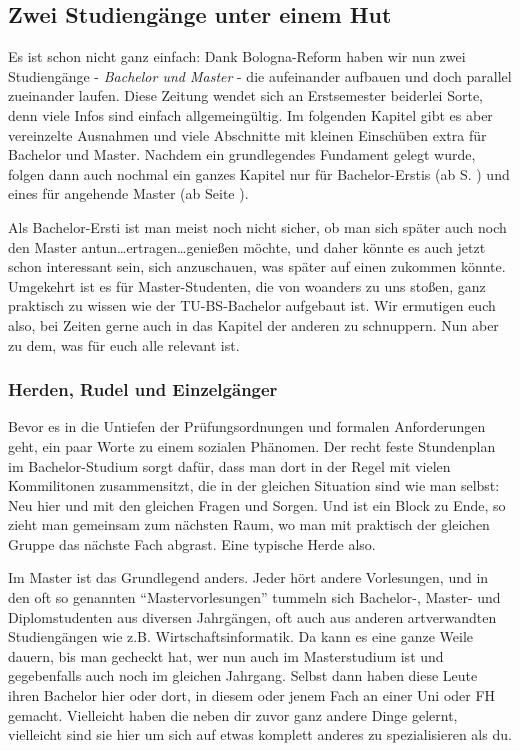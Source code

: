 \begin{multicols}{2}
\subsection{Zwei Studiengänge unter einem Hut}
	Es ist schon nicht ganz einfach: Dank Bologna-Reform haben wir nun zwei Studiengänge - \textit{Bachelor und Master} - die aufeinander aufbauen und doch parallel zueinander laufen. Diese Zeitung wendet sich an Erstsemester beiderlei Sorte, denn viele Infos sind einfach allgemeingültig. Im folgenden Kapitel gibt es aber vereinzelte Ausnahmen und viele Abschnitte mit kleinen Einschüben extra für Bachelor und Master. Nachdem ein grundlegendes Fundament gelegt wurde, folgen dann auch nochmal ein ganzes Kapitel nur für Bachelor-Erstis (ab S. \pageref{bachelor}) und eines für angehende Master (ab Seite \pageref{master}).

	Als Bachelor-Ersti ist man meist noch nicht sicher, ob man sich später auch noch den Master antun\ldots ertragen\ldots genießen möchte, und daher könnte es auch jetzt schon interessant sein, sich anzuschauen, was später auf einen zukommen könnte. Umgekehrt ist es für Master-Studenten, die von woanders zu uns stoßen, ganz praktisch zu wissen wie der TU-BS-Bachelor aufgebaut ist. Wir ermutigen euch also, bei Zeiten gerne auch in das Kapitel der anderen zu schnuppern. Nun aber zu dem, was für euch alle relevant ist.

\subsubsection{Herden, Rudel und Einzelgänger}
	Bevor es in die Untiefen der Prüfungsordnungen und formalen Anforderungen geht, ein paar Worte zu einem sozialen Phänomen. Der recht feste Stundenplan im Bachelor-Studium sorgt dafür, dass man dort in der Regel mit vielen Kommilitonen zusammensitzt, die in der gleichen Situation sind wie man selbst: Neu hier und mit den gleichen Fragen und Sorgen. Und ist ein Block zu Ende, so zieht man gemeinsam zum nächsten Raum, wo man mit praktisch der gleichen Gruppe das nächste Fach abgrast. Eine typische Herde also.

	Im Master ist das Grundlegend anders. Jeder hört andere Vorlesungen, und in den oft so genannten "`Mastervorlesungen"' tummeln sich Bachelor-, Master- und Diplomstudenten aus diversen Jahrgängen, oft auch aus anderen artverwandten Studiengängen wie z.B. Wirtschaftsinformatik. Da kann es eine ganze Weile dauern, bis man gecheckt hat, wer nun auch im Masterstudium ist und gegebenfalls auch noch im gleichen Jahrgang. Selbst dann haben diese Leute ihren Bachelor hier oder dort, in diesem oder jenem Fach an einer Uni oder FH gemacht. Vielleicht haben die neben dir zuvor ganz andere Dinge gelernt, vielleicht sind sie hier um sich auf etwas komplett anderes zu spezialisieren als du.


\end{multicols}

